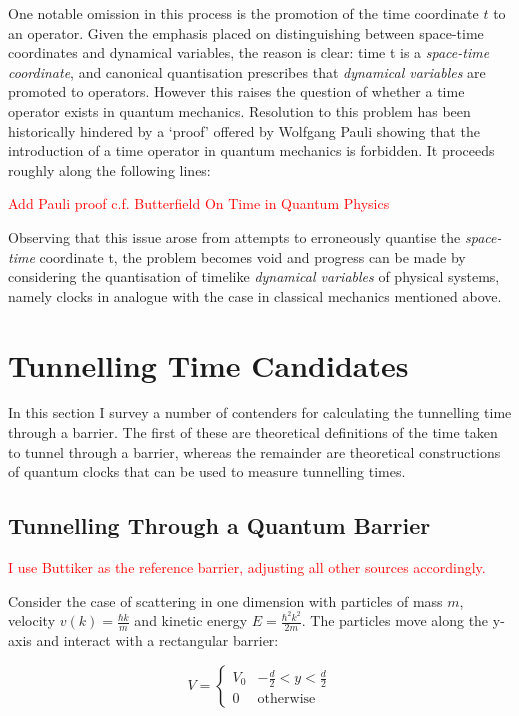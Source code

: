 \documentclass{article}
\begin{document}
One notable omission in this process is the promotion of the time coordinate $t$ to an operator. Given the emphasis placed on distinguishing between space-time coordinates and dynamical variables, the reason is clear: time t is a \textit{space-time coordinate}, and canonical quantisation prescribes that \textit{dynamical variables} are promoted to operators. However this raises the question of whether a time operator exists in quantum mechanics. Resolution to this problem has been historically hindered by a `proof' offered by Wolfgang Pauli showing that the introduction of a time operator in quantum mechanics is forbidden. It proceeds roughly along the following lines:

\textcolor{red}{Add Pauli proof c.f. Butterfield On Time in Quantum Physics}

Observing that this issue arose from attempts to erroneously quantise the \textit{space-time} coordinate t, the problem becomes void and progress can be made by considering the quantisation of timelike \textit{dynamical variables} of physical systems, namely clocks in analogue with the case in classical mechanics mentioned above. 

\section{Tunnelling Time Candidates}

In this section I survey a number of contenders for calculating the tunnelling time through a barrier. The first of these are theoretical definitions of the time taken to tunnel through a barrier, whereas the remainder are theoretical constructions of quantum clocks that can be used to measure tunnelling times.

\subsection{Tunnelling Through a Quantum Barrier}
\label{section:quantumbarrier}
\noindent \textcolor{red}{I use Buttiker as the reference barrier, adjusting all other sources accordingly.}

\noindent Consider the case of scattering in one dimension with particles of mass $m$, velocity $v(k) = \frac{\hbar k}{m}$ and kinetic energy $E = \frac{\hbar^2k^2}{2m}$. The particles move along the y-axis and interact with a rectangular barrier:

\begin{equation}
	V = 
	\begin{cases}
	V_0 & -\frac{d}{2}<y<\frac{d}{2}\\
		0 & \text{otherwise}
	\end{cases}
\end{equation}
\end{document}
